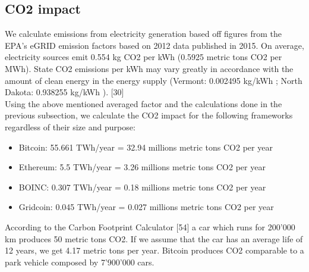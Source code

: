 \subsection{CO2 impact}

We calculate emissions from electricity generation based off figures from the EPA’s eGRID emission factors based on 2012 data published in 2015.  On average, electricity sources emit 0.554 kg CO2 per kWh (0.5925 metric tons CO2 per MWh). State CO2 emissions per kWh may vary greatly in accordance with the amount of clean energy in the energy supply (Vermont: 0.002495 kg/kWh ; North Dakota: 0.938255 kg/kWh ). [30]\\

Using the above mentioned averaged factor and the calculations done in the previous subsection, we calculate the CO2 impact for the following frameworks regardless of their size and purpose:

\begin{itemize}
  \item Bitcoin: 55.661 TWh/year = 32.94 millions metric tons CO2 per year
  \item Ethereum: 5.5 TWh/year = 3.26 millions metric tons CO2 per year
  \item BOINC: 0.307 TWh/year = 0.18 millions metric tons CO2 per year
  \item Gridcoin: 0.045 TWh/year =  0.027 millions metric tons CO2 per year
\end{itemize}

According to the Carbon Footprint Calculator [54] a car which runs for 200'000 km produces 50 metric tons CO2. If we assume that the car has an average life of 12 years, we get 4.17 metric tons per year. Bitcoin produces CO2 comparable to a park vehicle composed by 7'900'000 cars. 


 